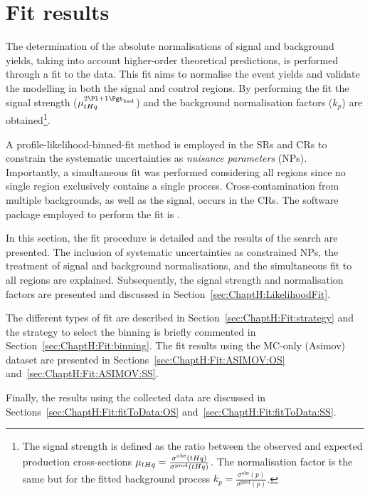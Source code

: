 \section{Fit results}
\label{sec:ChaptH:Fit}
The determination of the absolute normalisations of signal and background yields, 
taking into account higher-order theoretical predictions, is performed through a fit 
to the data. This fit aims to normalise the event yields and validate the modelling in 
both the signal and control regions. By performing the fit the signal 
strength
($\mu_{\tHq}^{\dileptau}$) and
the background normalisation factors ($k_{p}$) are 
obtained\footnote{The signal strength is defined as the ratio between the observed
and expected production cross-sections  $\mu_{tHq} = \frac{\sigma^{\text{obs}}(tHq)}{\sigma^{\text{pred}}(tHq)}$.
The normalisation factor is the same but for the fitted background 
process $k_{p} = \frac{\sigma^{\text{obs}}(p)}{\sigma^{\text{pred}}(p)}$. }. 

A profile-likelihood-binned-fit method is employed in the SRs and CRs to constrain the systematic 
uncertainties as \textit{nuisance parameters} (NPs). Importantly, a simultaneous 
fit was performed considering all regions since no single region exclusively contains a 
single process. Cross-contamination from multiple backgrounds, as well as the signal, 
occurs in the CRs. The software package employed to perform the fit is \trexfitter. %


In this section, the fit procedure is detailed and the results of the \tHq search
are presented. The inclusion of 
systematic uncertainties as constrained NPs, the treatment of signal 
and background normalisations, and the simultaneous fit to all regions are explained. 
Subsequently, the signal strength and normalisation factors are presented and discussed 
in Section~\ref{sec:ChaptH:LikelihoodFit}.

The different types of fit are described in Section~\ref{sec:ChaptH:Fit:strategy} and the
strategy to select the binning is briefly commented in Section~\ref{sec:ChaptH:Fit:binning}.
The fit results using the MC-only (Asimov) dataset are presented in Sections~\ref{sec:ChaptH:Fit:ASIMOV:OS}
and~\ref{sec:ChaptH:Fit:ASIMOV:SS}.

Finally, the results using the collected data are discussed in
Sections~\ref{sec:ChaptH:Fit:fitToData:OS} and~\ref{sec:ChaptH:Fit:fitToData:SS}.



